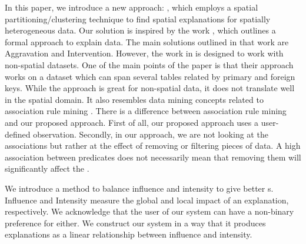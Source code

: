 
In this paper, we introduce a new approach: {\solution}, which employs a spatial partitioning/clustering technique to find spatial explanations for spatially heterogeneous data. Our solution is inspired by the work \cite{roy2014formal}, which outlines a formal approach to explain data. The main solutions outlined in that work are Aggravation and Intervention. However, the work in \cite{roy2014formal} is designed to work with non-spatial datasets. One of the main points of the paper is that their approach works on a dataset which can span several tables related by primary and foreign keys. While the approach is great for non-spatial data, it does not translate well in the spatial domain. 
It also resembles data mining concepts related to association rule mining \cite{agarwal1994fast,tan2006introduction}. 
There is a difference between association rule mining and our proposed approach. First of all, our proposed approach uses a user-defined observation. Secondly, in our approach, we are not looking at the associations but rather at the effect of removing or filtering pieces of data. A high association between predicates does not necessarily mean that removing them will significantly affect the {\fact}.


We introduce a method to balance influence and intensity to give better {\explanation}s. Influence and Intensity measure the global and local impact of an explanation, respectively. We acknowledge that the user of our system can have a non-binary preference for either. We construct our system in a way that it produces explanations as a linear relationship between influence and intensity.


